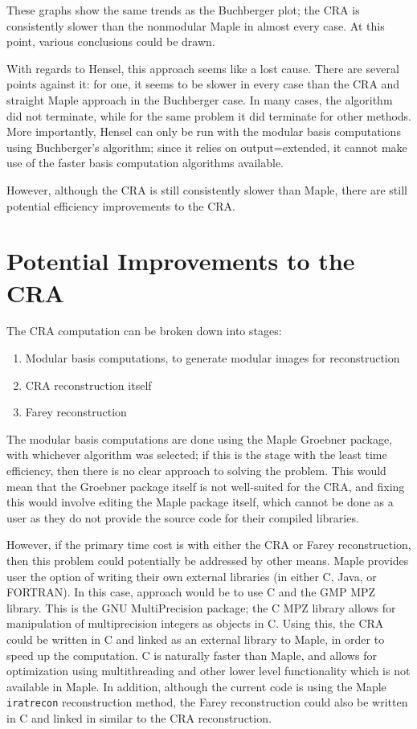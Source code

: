 \documentclass[letterpaper,12pt,titlepage,oneside,final]{book}
\begin{document}
These graphs show the same trends as the Buchberger plot; the CRA is consistently slower than the nonmodular Maple in almost every case.  At this point, various conclusions could be drawn.

With regards to Hensel, this approach seems like a lost cause.  There are several points against it: for one, it seems to be slower in every case than the CRA and straight Maple approach in the Buchberger case.  In many cases, the algorithm did not terminate, while for the same problem it did terminate for other methods.  More importantly, Hensel can only be run with the modular basis computations using Buchberger's algorithm; since it relies on output=extended, it cannot make use of the faster basis computation algorithms available.  %

However, although the CRA is still consistently slower than Maple, there are still potential efficiency improvements to the CRA.

\section{Potential Improvements to the CRA} 

The CRA computation can be broken down into stages:

\begin{enumerate}
  \item Modular basis computations, to generate modular images for reconstruction
  \item CRA reconstruction itself
  \item Farey reconstruction
\end{enumerate}

The modular basis computations are done using the Maple Groebner package, with whichever algorithm was selected; if this is the stage with the least time efficiency, then there is no clear approach to solving the problem.  This would mean that the Groebner package itself is not well-suited for the CRA, and fixing this would involve editing the Maple package itself, which cannot be done as a user as they do not provide the source code for their compiled libraries.

However, if the primary time cost is with either the CRA or Farey reconstruction, then this problem could potentially be addressed by other means.  Maple provides user the option of writing their own external libraries (in either C, Java, or FORTRAN).  In this case, approach would be to use C and the GMP MPZ library.  This is the GNU MultiPrecision package; the C MPZ library allows for manipulation of multiprecision integers as objects in C.  Using this, the CRA could be written in C and linked as an external library to Maple, in order to speed up the computation.  C is naturally faster than Maple, and allows for optimization using multithreading and other lower level functionality which is not available in Maple.  In addition, although the current code is using the Maple \texttt{iratrecon} reconstruction method, the Farey reconstruction could also be written in C and linked in similar to the CRA reconstruction.
\end{document}
